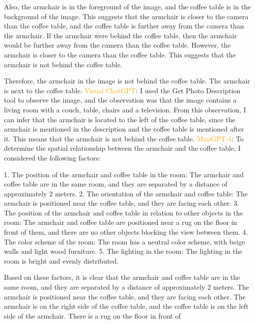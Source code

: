 \begin{enumerate}
    Also, the armchair is in the foreground of the image, and the coffee table is in the background of the image. This suggests that the armchair is closer to the camera than the coffee table, and the coffee table is further away from the camera than the armchair. If the armchair were behind the coffee table, then the armchair would be further away from the camera than the coffee table. However, the armchair is closer to the camera than the coffee table. This suggests that the armchair is not behind the coffee table.
    
    Therefore, the armchair in the image is not behind the coffee table. The armchair is next to the coffee table.
    \subitem \textcolor{orange}{Visual ChatGPT}: I used the Get Photo Description tool to observe the image, and the observation was that the image contains a living room with a couch, table, chairs and a television. From this observation, I can infer that the armchair is located to the left of the coffee table, since the armchair is mentioned in the description and the coffee table is mentioned after it. This means that the armchair is not behind the coffee table.
    \subitem \textcolor{orange}{MiniGPT-4}: To determine the spatial relationship between the armchair and the coffee table, I considered the following factors:

    1. The position of the armchair and coffee table in the room: The armchair and coffee table are in the same room, and they are separated by a distance of approximately 2 meters.
    2. The orientation of the armchair and coffee table: The armchair is positioned near the coffee table, and they are facing each other.
    3. The position of the armchair and coffee table in relation to other objects in the room: The armchair and coffee table are positioned near a rug on the floor in front of them, and there are no other objects blocking the view between them.
    4. The color scheme of the room: The room has a neutral color scheme, with beige walls and light wood furniture.
    5. The lighting in the room: The lighting in the room is bright and evenly distributed.
    
    Based on these factors, it is clear that the armchair and coffee table are in the same room, and they are separated by a distance of approximately 2 meters. The armchair is positioned near the coffee table, and they are facing each other. The armchair is on the right side of the coffee table, and the coffee table is on the left side of the armchair. There is a rug on the floor in front of
\end{enumerate}
